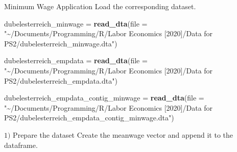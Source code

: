 \documentclass[
  ignorenonframetext,
]{beamer}
\newenvironment{Shaded}{\begin{snugshade}}{\end{snugshade}}
\newcommand{\DataTypeTok}[1]{\textcolor[rgb]{0.13,0.29,0.53}{#1}}
\newcommand{\DecValTok}[1]{\textcolor[rgb]{0.00,0.00,0.81}{#1}}
\newcommand{\KeywordTok}[1]{\textcolor[rgb]{0.13,0.29,0.53}{\textbf{#1}}}
\newcommand{\NormalTok}[1]{#1}
\newcommand{\OperatorTok}[1]{\textcolor[rgb]{0.81,0.36,0.00}{\textbf{#1}}}
\newcommand{\StringTok}[1]{\textcolor[rgb]{0.31,0.60,0.02}{#1}}
\begin{document}
\begin{frame}[fragile]{Minimum Wage Application}
\protect\hypertarget{minimum-wage-application}{}
\hfill\break
\hfill\break
\hfill\break
Load the corresponding dataset.

\begin{Shaded}
\begin{Highlighting}[]
\NormalTok{dubelesterreich\_minwage =}\StringTok{ }\KeywordTok{read\_dta}\NormalTok{(}\DataTypeTok{file =} \StringTok{"\textasciitilde{}/Documents/Programming/R/Labor Economics [2020]/Data for PS2/dubelesterreich\_minwage.dta"}\NormalTok{)}

\NormalTok{dubelesterreich\_empdata =}\StringTok{ }\KeywordTok{read\_dta}\NormalTok{(}\DataTypeTok{file =} \StringTok{"\textasciitilde{}/Documents/Programming/R/Labor Economics [2020]/Data for PS2/dubelesterreich\_empdata.dta"}\NormalTok{)}

\NormalTok{dubelesterreich\_empdata\_contig\_minwage =}\StringTok{ }\KeywordTok{read\_dta}\NormalTok{(}\DataTypeTok{file =} \StringTok{"\textasciitilde{}/Documents/Programming/R/Labor Economics [2020]/Data for PS2/dubelesterreich\_empdata\_contig\_minwage.dta"}\NormalTok{)}
\end{Highlighting}
\end{Shaded}

\hfill\break
\hfill\break
\hfill\break

\begin{block}{\(1)\) Prepare the dataset}
\protect\hypertarget{prepare-the-dataset}{}
\hfill\break
Create the meanwage vector and append it to the dataframe.\\

\begin{Shaded}
\end{Shaded}
\end{block}
\end{frame}
\end{document}
